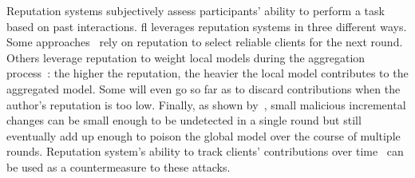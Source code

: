 Reputation systems subjectively assess participants' ability to perform a task based on past interactions.
\gls{fl} leverages reputation systems in three different ways.
Some approaches~\cite{kang_reliable_2020, awan_contra_2021, tan_reputation-aware_2022} rely on reputation to select reliable clients for the next round.
Others leverage reputation to weight local models during the aggregation process~\cite{wang_flare_2022, wang_reputation-enabled_2021}: the higher the reputation, the heavier the local model contributes to the aggregated model.
Some will even go so far as to discard contributions when the author's reputation is too low.
%
Finally, as shown by~\citet{karimireddy_learning_2021}, small malicious incremental changes can be small enough to be undetected in a single round but still eventually add up enough to poison the global model over the course of multiple rounds. 
Reputation system's ability to track clients' contributions over time~\cite{kang_reliable_2020, wang_reputation-enabled_2021} can be used as a countermeasure to these attacks. 

 


